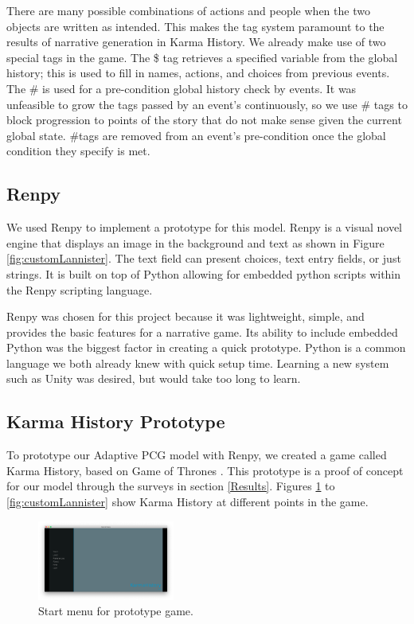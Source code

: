 There are many possible combinations of actions and people when the two objects are written as intended. This makes the tag system paramount to the results of narrative generation in Karma History. We already make use of two special tags in the game. The \$ tag retrieves a specified variable from the global history; this is used to fill in names, actions, and choices from previous events. The \# is used for a pre-condition global history check by events. It was unfeasible to grow the tags passed by an event's continuously, so we use \# tags to block progression to points of the story that do not make sense given the current global state. \#tags are removed from an event's pre-condition once the global condition they specify is met.

\subsection{Renpy} \label{Renpy}
We used Renpy \cite{renpy} to implement a prototype for this model. Renpy is a visual novel engine that displays an image in the background and text as shown in Figure \ref{fig:customLannister}. The text field can present choices, text entry fields, or just strings. It is built on top of Python \cite{python} allowing for embedded python scripts within the Renpy scripting language.

Renpy was chosen for this project because it was lightweight, simple, and provides the basic features for a narrative game. Its ability to include embedded Python was the biggest factor in creating a quick prototype. Python is a common language we both already knew with quick setup time. Learning a new system such as Unity \cite{unity} was desired, but would take too long to learn.

\subsection{Karma History Prototype} \label{Karma History Prototype}
To prototype our Adaptive PCG model with Renpy, we created a game called Karma History, based on Game of Thrones \cite{got}. This prototype is a proof of concept for our model through the surveys in section \ref{Results}. Figures \ref{fig:menu} to \ref{fig:customLannister} show Karma History at different points in the game. 

\begin{figure}[ht]
    \centering
    \includegraphics[width=0.4\textwidth]{images/menu.png}
    \caption{Start menu for prototype game.}
    \label{fig:menu}
\end{figure}

